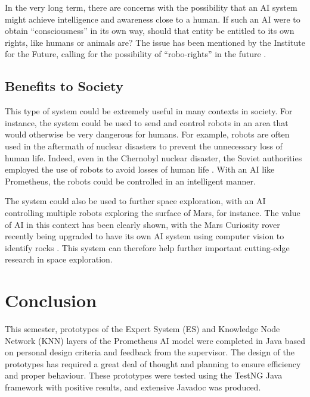 \documentclass[titlepage,11pt]{article}
\begin{document}
In the very long term, there are concerns with the possibility that an AI system might achieve intelligence and awareness close to a human. If such an AI were to obtain ``consciousness'' in its own way, should that entity be entitled to its own rights, like humans or animals are? The issue has been mentioned by the Institute for the Future, calling for the possibility of ``robo-rights'' in the future \cite{robo_rights}.



\subsection{Benefits to Society}

This type of system could be extremely useful in many contexts in society. For instance, the system could be used to send and control robots in an area that would otherwise be very dangerous for humans. For example, robots are often used in the aftermath of nuclear disasters to prevent the unnecessary loss of human life. Indeed, even in the Chernobyl nuclear disaster, the Soviet authorities employed the use of robots to avoid losses of human life \cite{chernobyl}. With an AI like Prometheus, the robots could be controlled in an intelligent manner.

The system could also be used to further space exploration, with an AI controlling multiple robots exploring the surface of Mars, for instance. The value of AI in this context has been clearly shown, with the Mars Curiosity rover recently being upgraded to have its own AI system using computer vision to identify rocks \cite{rover}. This system can therefore help further important cutting-edge research in space exploration.

\section{Conclusion}

This semester, prototypes of the Expert System (ES) and Knowledge Node Network (KNN) layers of the Prometheus AI model were completed in Java based on personal design criteria and feedback from the supervisor. The design of the prototypes has required a great deal of thought and planning to ensure efficiency and proper behaviour. These prototypes were tested using the TestNG Java framework with positive results, and extensive Javadoc was produced.
\end{document}
